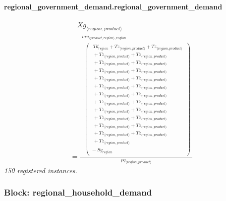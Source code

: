 \documentclass[11pt]{article}
\begin{document}
\paragraph{regional\_government\_demand.regional\_government\_demand}
\begin{align*}
&\quad Xg_{\langle region, product\rangle}\\
&= \frac{\begin{aligned}
mu_{\langle product, region\rangle,region}\\
{}\cdot (\begin{aligned}
\begin{aligned}
Td_{region} + Tz_{\langle region, product\rangle} + Tz_{\langle region, product\rangle}\\
{}+ Tz_{\langle region, product\rangle} + Tz_{\langle region, product\rangle}\\
{}+ Tz_{\langle region, product\rangle} + Tz_{\langle region, product\rangle}\\
{}+ Tz_{\langle region, product\rangle} + Tz_{\langle region, product\rangle}\\
{}+ Tz_{\langle region, product\rangle} + Tz_{\langle region, product\rangle}\\
{}+ Tz_{\langle region, product\rangle} + Tz_{\langle region, product\rangle}\\
{}+ Tz_{\langle region, product\rangle} + Tz_{\langle region, product\rangle}\\
{}+ Tz_{\langle region, product\rangle} + Tz_{\langle region, product\rangle}\\
{}+ Tz_{\langle region, product\rangle} + Tz_{\langle region, product\rangle}\\
{}+ Tz_{\langle region, product\rangle} + Tz_{\langle region, product\rangle}\\
{}+ Tz_{\langle region, product\rangle} + Tz_{\langle region, product\rangle}\\
{}+ Tz_{\langle region, product\rangle} + Tz_{\langle region, product\rangle}\\
{}+ Tz_{\langle region, product\rangle}
\end{aligned}\\
{}- Sg_{region}
\end{aligned})
\end{aligned}}{pq_{\langle region, product\rangle}}
\end{align*}
\noindent\emph{150 registered instances.}\par
\subsubsection*{Block: regional\_household\_demand}
\end{document}
